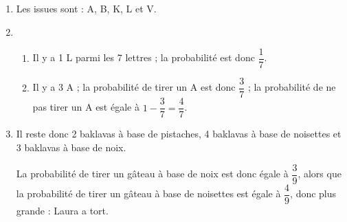 
\medskip

%
%

\begin{enumerate}
\item %
Les issues sont : A, B, K, L et V.
\item %
	\begin{enumerate}
		\item %
Il y a 1 L parmi les 7 lettres ; la probabilité est donc $\dfrac{1}{7}$.		
		\item %
Il y a 3 A ; la probabilité de tirer un A est donc $\dfrac{3}{7}$ ; la probabilité de ne pas tirer un A est égale à $1 - \dfrac{3}{7} = \dfrac{4}{7}$.
	\end{enumerate}
\item  %
	
	


Il reste donc 2 baklavas à base de pistaches, 4 baklavas à base de noisettes et 3 baklavas à base de noix.

La probabilité de tirer un gâteau à base de noix est donc égale à $\dfrac{3}{9}$, alors que la probabilité de tirer un gâteau à base de noisettes est égale à $\dfrac{4}{9}$, donc plus grande : Laura a tort.
\end{enumerate}

\bigskip

